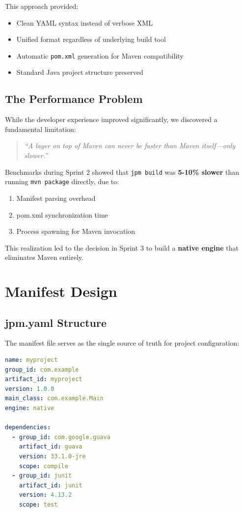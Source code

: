 \documentclass[12pt,a4paper]{report}
\begin{document}
This approach provided:
\begin{itemize}
    \item Clean YAML syntax instead of verbose XML
    \item Unified format regardless of underlying build tool
    \item Automatic \texttt{pom.xml} generation for Maven compatibility
    \item Standard Java project structure preserved
\end{itemize}

\subsection{The Performance Problem}

While the developer experience improved significantly, we discovered a fundamental limitation:

\begin{quote}
\textit{``A layer on top of Maven can never be faster than Maven itself—only slower.''}
\end{quote}

Benchmarks during Sprint 2 showed that \texttt{jpm build} was \textbf{5-10\% slower} than running \texttt{mvn package} directly, due to:
\begin{enumerate}
    \item Manifest parsing overhead
    \item pom.xml synchronization time
    \item Process spawning for Maven invocation
\end{enumerate}

This realization led to the decision in Sprint 3 to build a \textbf{native engine} that eliminates Maven entirely.

\section{Manifest Design}

\subsection{jpm.yaml Structure}

The manifest file serves as the single source of truth for project configuration:

\begin{lstlisting}[language=yaml, caption=jpm.yaml Example]
name: myproject
group_id: com.example
artifact_id: myproject
version: 1.0.0
main_class: com.example.Main
engine: native

dependencies:
  - group_id: com.google.guava
    artifact_id: guava
    version: 33.1.0-jre
    scope: compile
  - group_id: junit
    artifact_id: junit
    version: 4.13.2
    scope: test
\end{lstlisting}
\end{document}
